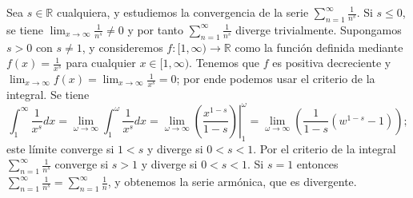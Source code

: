\begin{example}
  Sea $s\in\mathbb{R}$ cualquiera, y estudiemos la convergencia de la serie $\sum_{n=1}^\infty \frac{1}{n^s}$. Si $s\leq 0$, se tiene $\lim_{x\to\infty}\frac{1}{n^s}\neq 0$ y por tanto $\sum_{n=1}^\infty \frac{1}{n^s}$ diverge trivialmente. Supongamos $s>0$ con $s\neq 1$, y consideremos $f:[1,\infty)\to\mathbb{R}$ como la función definida mediante $f(x)=\frac{1}{x^s}$ para cualquier $x\in[1,\infty)$. Tenemos que $f$ es positiva decreciente y $\lim_{x\to\infty}f(x)=\lim_{x\to\infty}\frac{1}{x^s}=0$; por ende podemos usar el criterio de la integral. Se tiene
  \begin{equation*}
    \int_1^\infty\frac{1}{x^s}dx=\lim_{\omega\to\infty}\int_1^\omega\frac{1}{x^s}dx=\lim_{\omega\to\infty}\left.\left(\frac{x^{1-s}}{1-s}\right)\right|_1^\omega=\lim_{\omega\to\infty}\left(\frac{1}{1-s}(w^{1-s}-1)\right);
  \end{equation*}
  este límite converge si $1<s$ y diverge si $0<s<1$. Por el criterio de la integral $\sum_{n=1}^\infty \frac{1}{n^s}$ converge si $s>1$ y diverge si $0<s<1$. Si $s=1$ entonces $\sum_{n=1}^\infty \frac{1}{n^s}=\sum_{n=1}^\infty \frac{1}{n}$, y obtenemos la serie armónica, que es divergente.
\end{example}

